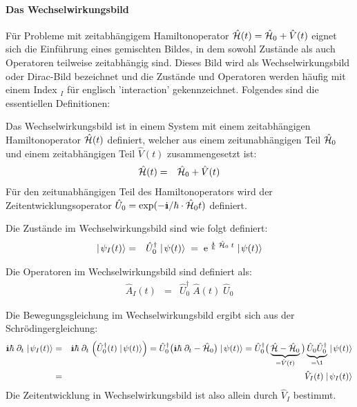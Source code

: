 \paragraph{Das Wechselwirkungsbild}

Für Probleme mit zeitabhängigem Hamiltonoperator $\hat{\mathcal H}(t)=\hat{\mathcal H}_0+\hat{V}(t)$ eignet sich die Einführung eines gemischten Bildes, in dem sowohl Zustände als auch Operatoren teilweise zeitabhängig sind. Dieses Bild wird als Wechselwirkungsbild oder Dirac-Bild bezeichnet und die Zustände und Operatoren werden häufig mit einem Index $_I$ für englisch 'interaction' gekennzeichnet. Folgendes sind die essentiellen Definitionen: 

\begin{itemize1}
	\item Das Wechselwirkungsbild ist in einem System mit einem zeitabhängigen Hamiltonoperator $\hat{\mathcal H}(t)$ definiert, welcher aus einem zeitunabhängigen Teil $\hat{\mathcal H}_0$ und einem zeitabhängigen Teil $\hat{V}(t)$ zusammengesetzt ist: 
	\begin{eqnarray*}
		\hat{\mathcal H}(t) &=& \hat{\mathcal H}_0+\hat{V}(t) 
	\end{eqnarray*}
	Für den zeitunabhängigen Teil des Hamiltonoperators wird der Zeitentwicklungsoperator $\hat{U}_0=\exp(-\I/\hbar\cdot \hat{\ham}_0t)$ definiert. 
	\item Die Zustände im Wechselwirkungsbild sind wie folgt definiert: 
	\begin{eqnarray*}
		\ket{\psi_I(t)} &=& \hat{U}_0^{\dagger}\ket{\psi(t)} \;=\; \e^{\;\frac{\I}{\hbar}\; \hat{\ham}_0\; t}\ket{\psi(t)}
	\end{eqnarray*}
	\item Die Operatoren im Wechselwirkungsbild sind definiert als: 
	\begin{eqnarray*}
		\hat{A}_I(t) &=& \hat{U}^{\dagger}_0\;\hat{A}(t)\;\hat{U}_0
	\end{eqnarray*}
	\item Die Bewegungsgleichung im Wechselwirkungsbild ergibt sich aus der Schrödingergleichung: 
	\begin{eqnarray}
		\I\hbar\;\dell_t \ket{\psi_I(t)} &=& \I\hbar\;\dell_t \;\Big(\hat{U}^{\dagger}_0(t) \ket{\psi(t)}\Big) = \hat{U}^{\dagger}_0 \big(\I\hbar\;\dell_t-\hat{\ham}_0\big)\ket{\psi(t)} = \hat{U}^{\dagger}_0\big(\underbrace{\hat{\ham}-\hat{\ham}_0}_{=\hat{V}(t)}\big)\underbrace{\hat{U}_0 \hat{U}^{\dagger}_0}_{=\1} \ket{\psi(t)} \nonumber
		\\
		&=& \hat{V}_I(t) \ket{\psi_I(t)} \label{WechselwirkungsbildSG}
	\end{eqnarray}
	Die Zeitentwicklung in Wechselwirkungsbild ist also allein durch $\hat{V}_I$ bestimmt. 
\end{itemize1}

